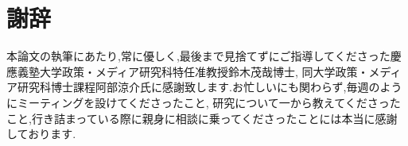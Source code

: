 \chapter*{謝辞}
\label{thanks}

本論文の執筆にあたり,常に優しく,最後まで見捨てずにご指導してくださった慶應義塾大学政策・メディア研究科特任准教授鈴木茂哉博士,
同大学政策・メディア研究科博士課程阿部涼介氏に感謝致します.お忙しいにも関わらず,毎週のようにミーティングを設けてくださったこと,
研究について一から教えてくださったこと,行き詰まっている際に親身に相談に乗ってくださったことには本当に感謝しております.


